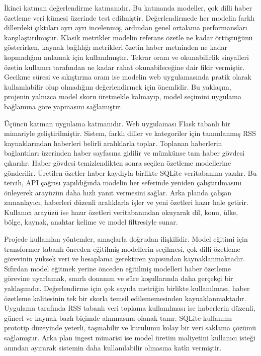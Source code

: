 İkinci katman değerlendirme katmanıdır. Bu katmanda modeller, çok dilli haber özetleme veri kümesi üzerinde test edilmiştir. Değerlendirmede her modelin farklı dillerdeki çıktıları ayrı ayrı incelenmiş, ardından genel ortalama performansları karşılaştırılmıştır. Klasik metrikler modelin referans özetle ne kadar örtüştüğünü gösterirken, kaynak bağlılığı metrikleri özetin haber metninden ne kadar kopmadığını anlamak için kullanılmıştır. Tekrar oranı ve okunabilirlik sinyalleri özetin kullanıcı tarafından ne kadar rahat okunabileceğine dair fikir vermiştir. Gecikme süresi ve sıkıştırma oranı ise modelin web uygulamasında pratik olarak kullanılabilir olup olmadığını değerlendirmek için önemlidir. Bu yaklaşım, projenin yalnızca model skoru üretmekle kalmayıp, model seçimini uygulama bağlamına göre yapmasını sağlamıştır.

Üçüncü katman uygulama katmanıdır. Web uygulaması Flask tabanlı bir mimariyle geliştirilmiştir. Sistem, farklı diller ve kategoriler için tanımlanmış RSS kaynaklarından haberleri belirli aralıklarla toplar. Toplanan haberlerin bağlantıları üzerinden haber sayfasına gidilir ve mümkünse tam haber gövdesi çıkarılır. Haber gövdesi temizlendikten sonra seçilen özetleme modellerine gönderilir. Üretilen özetler haber kaydıyla birlikte SQLite veritabanına yazılır. Bu tercih, API çağrısı yapıldığında modelin her seferinde yeniden çalıştırılmasını önleyerek arayüzün daha hızlı yanıt vermesini sağlar. Arka planda çalışan zamanlayıcı, haberleri düzenli aralıklarla işler ve yeni özetleri hazır hale getirir. Kullanıcı arayüzü ise hazır özetleri veritabanından okuyarak dil, konu, ülke, bölge, kaynak, anahtar kelime ve model filtresiyle sunar.

Projede kullanılan yöntemler, amaçlarla doğrudan ilişkilidir. Model eğitimi için transformer tabanlı önceden eğitilmiş modellerin seçilmesi, çok dilli özetleme görevinin yüksek veri ve hesaplama gerektiren yapısından kaynaklanmaktadır. Sıfırdan model eğitmek yerine önceden eğitilmiş modelleri haber özetleme görevine uyarlamak, sınırlı donanım ve süre koşullarında daha gerçekçi bir yaklaşımdır. Değerlendirme için çok sayıda metriğin birlikte kullanılması, haber özetleme kalitesinin tek bir skorla temsil edilememesinden kaynaklanmaktadır. Uygulama tarafında RSS tabanlı veri toplama kullanılması ise haberlerin düzenli, güncel ve kaynak bazlı biçimde alınmasına olanak tanır. SQLite kullanımı prototip düzeyinde yeterli, taşınabilir ve kurulumu kolay bir veri saklama çözümü sağlamıştır. Arka plan ingest mimarisi ise model üretim maliyetini kullanıcı isteği anından ayırarak sistemin daha kullanılabilir olmasına katkı vermiştir.

